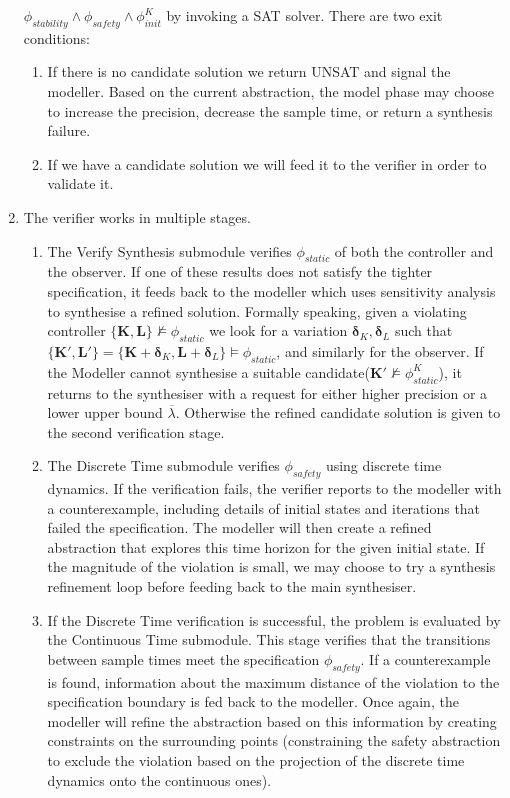 \documentclass[sigconf]{llncs}
\newcommand{\mat}[1]{\boldsymbol{#1}}
\begin{document}
\begin{enumerate}
$\phi_\mathit{stability} \wedge \phi_\mathit{safety} \wedge \phi_\mathit{init}^{K}$ by invoking a SAT solver.
There are two exit conditions:
\begin{enumerate}
\item If there is no candidate solution we return UNSAT and signal the modeller. Based on the current abstraction,
the {\sc  model} phase may choose to increase the precision, decrease the sample time, or return a synthesis failure.
\item If we have a candidate solution we will feed it to the verifier in order to validate it.
\end{enumerate}
\item The verifier works in multiple stages.
\begin{enumerate}
%
\item The {\sc Verify Synthesis} submodule verifies $\phi_{static}$ of  both the
controller and the observer.  If one of these results does not satisfy the tighter
specification, it feeds back to the modeller which uses sensitivity analysis to
synthesise a refined solution. 
Formally speaking, given a violating controller $\{ \mat{K},\mat{L} \} \not \models \phi_{static}$
we look for a variation $\mat{\delta}_K, \mat{\delta}_L$ such that
$\{ \mat{K}', \mat{L}' \}=\{ \mat{K}+\mat{\delta}_K,\mat{L}+\mat{\delta}_L \} \models \phi_{static}$, and similarly for the observer.
If the Modeller cannot synthesise a suitable candidate($\mat{K}' \not
\models \phi_{static}^K$), it returns to the synthesiser with a request for
either higher precision or a lower upper bound $\overline{\lambda}$. Otherwise
the refined candidate solution is given to the second verification stage.
%
\item The {\sc Discrete Time} submodule verifies $\phi_{safety}$ using discrete
time dynamics.  If the verification fails, the verifier reports to the
modeller with a counterexample, including details of initial states and
iterations that failed the specification.  The modeller will then create a
refined abstraction that explores this time horizon for the given initial
state.  If the magnitude of the violation is small, we may choose to try
a synthesis refinement loop before feeding back to the main synthesiser.
%
\item If the Discrete Time verification is successful, the problem is
evaluated by the {\sc Continuous Time} submodule.  This stage verifies that the
transitions between sample times meet the specification $\phi_{safety}$.  If
a counterexample is found, information about the maximum distance of the
violation to the specification boundary is fed back to the modeller.  Once
again, the modeller will refine the abstraction based on this information by
creating constraints on the surrounding points (constraining the safety
abstraction to exclude the violation based on the projection of the discrete
time dynamics onto the continuous ones).
%
\end{enumerate}


\end{enumerate}
\end{document}
